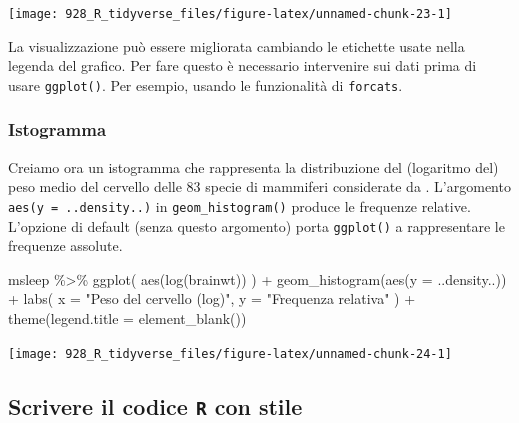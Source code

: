 \documentclass[
  10pt,
  italian,
  a4paper,
  extrafontsizes,onecolumn,openright
  ]{memoir}
\newenvironment{Shaded}{\begin{snugshade}}{\end{snugshade}}
\newcommand{\AttributeTok}[1]{\textcolor[rgb]{0.77,0.63,0.00}{#1}}
\newcommand{\FunctionTok}[1]{\textcolor[rgb]{0.00,0.00,0.00}{#1}}
\newcommand{\NormalTok}[1]{#1}
\newcommand{\SpecialCharTok}[1]{\textcolor[rgb]{0.00,0.00,0.00}{#1}}
\newcommand{\StringTok}[1]{\textcolor[rgb]{0.31,0.60,0.02}{#1}}
\begin{document}
\begin{center}\texttt{[image: 928\_R\_tidyverse\_files/figure-latex/unnamed-chunk-23-1]} \end{center}

La visualizzazione può essere migliorata cambiando le etichette usate nella legenda del grafico. Per fare questo è necessario intervenire sui dati prima di usare \texttt{ggplot()}. Per esempio, usando le funzionalità di \texttt{forcats}.

\hypertarget{istogramma}{%
\subsubsection{Istogramma}\label{istogramma}}

Creiamo ora un istogramma che rappresenta la distribuzione del (logaritmo del) peso medio del cervello delle 83 specie di mammiferi considerate da \textcite{savage2007quantitative}. L'argomento \texttt{aes(y\ =\ ..density..)} in \texttt{geom\_histogram()} produce le frequenze relative. L'opzione di default (senza questo argomento) porta \texttt{ggplot()} a rappresentare le frequenze assolute.

\begin{Shaded}
\begin{Highlighting}[]
\NormalTok{msleep }\SpecialCharTok{\%\textgreater{}\%} 
  \FunctionTok{ggplot}\NormalTok{(}
    \FunctionTok{aes}\NormalTok{(}\FunctionTok{log}\NormalTok{(brainwt))}
\NormalTok{  ) }\SpecialCharTok{+}
  \FunctionTok{geom\_histogram}\NormalTok{(}\FunctionTok{aes}\NormalTok{(}\AttributeTok{y =}\NormalTok{ ..density..)) }\SpecialCharTok{+}
  \FunctionTok{labs}\NormalTok{(}
    \AttributeTok{x =} \StringTok{"Peso del cervello (log)"}\NormalTok{,}
    \AttributeTok{y =} \StringTok{"Frequenza relativa"}
\NormalTok{  ) }\SpecialCharTok{+}
  \FunctionTok{theme}\NormalTok{(}\AttributeTok{legend.title =} \FunctionTok{element\_blank}\NormalTok{())}
\end{Highlighting}
\end{Shaded}

\begin{center}\texttt{[image: 928\_R\_tidyverse\_files/figure-latex/unnamed-chunk-24-1]} \end{center}

\hypertarget{scrivere-il-codice-r-con-stile}{%
\subsection{\texorpdfstring{Scrivere il codice \texttt{R} con stile}{Scrivere il codice R con stile}}\label{scrivere-il-codice-r-con-stile}}
\end{document}

